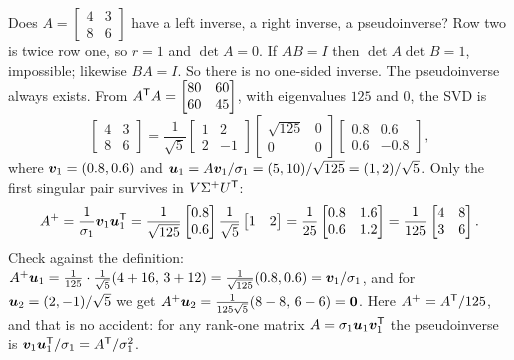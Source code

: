 \begin{example}\label{ex:u36-square}
Does $A=\begin{bmatrix}4&3\\8&6\end{bmatrix}$ have a left inverse, a right inverse, a pseudoinverse? Row two is twice row one, so $r=1$ and $\det A=0$. If $AB=I$ then $\det A\det B=1$, impossible; likewise $BA=I$. So there is no one-sided inverse. The pseudoinverse always exists. From $A^{\mathsf{T}} A=\begin{bmatrix}80&60\\60&45\end{bmatrix}$, with eigenvalues $125$ and $0$, the SVD is
\[
\begin{bmatrix}4&3\\8&6\end{bmatrix}=\frac{1}{\sqrt5}\begin{bmatrix}1&2\\2&-1\end{bmatrix}\begin{bmatrix}\sqrt{125}&0\\0&0\end{bmatrix}\begin{bmatrix}0.8&0.6\\0.6&-0.8\end{bmatrix},
\]
where $\boldsymbol{v}_1=(0.8,0.6)$ and $\boldsymbol{u}_1=A\boldsymbol{v}_1/\sigma_1=(5,10)/\sqrt{125}=(1,2)/\sqrt5$. Only the first singular pair survives in $V\Sigma^{+}U^{\mathsf{T}}$:
\[
A^{+}=\frac{1}{\sigma_1}\boldsymbol{v}_1\boldsymbol{u}_1^{\mathsf{T}}=\frac{1}{\sqrt{125}}\begin{bmatrix}0.8\\0.6\end{bmatrix}\frac{1}{\sqrt5}\begin{bmatrix}1&2\end{bmatrix}=\frac{1}{25}\begin{bmatrix}0.8&1.6\\0.6&1.2\end{bmatrix}=\frac{1}{125}\begin{bmatrix}4&8\\3&6\end{bmatrix}.
\]
Check against the definition: $A^{+}\boldsymbol{u}_1=\frac{1}{125}\cdot\frac{1}{\sqrt5}(4+16,\,3+12)=\frac{1}{\sqrt{125}}(0.8,0.6)=\boldsymbol{v}_1/\sigma_1$, and for $\boldsymbol{u}_2=(2,-1)/\sqrt5$ we get $A^{+}\boldsymbol{u}_2=\frac{1}{125\sqrt5}(8-8,\,6-6)=\boldsymbol{0}$. Here $A^{+}=A^{\mathsf{T}}/125$, and that is no accident: for any rank-one matrix $A=\sigma_1\boldsymbol{u}_1\boldsymbol{v}_1^{\mathsf{T}}$ the pseudoinverse is $\boldsymbol{v}_1\boldsymbol{u}_1^{\mathsf{T}}/\sigma_1=A^{\mathsf{T}}/\sigma_1^{2}$.
\end{example}

